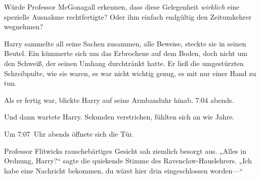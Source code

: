 Würde Professor McGonagall erkennen, dass diese Gelegenheit \emph{wirklich} eine spezielle Ausnahme rechtfertigte? Oder ihm einfach endgültig den Zeitumkehrer wegnehmen?

Harry sammelte all seine Sachen zusammen, alle Beweise, steckte sie in seinen Beutel. Ein  kümmerte sich um das Erbrochene auf dem Boden, doch nicht um den Schweiß, der seinen Umhang durchtränkt hatte. Er ließ die umgestürzten Schreibpulte, wie sie waren, es war nicht wichtig genug, es mit nur einer Hand zu tun.

Als er fertig war, blickte Harry auf seine Armbanduhr hinab. 7:04 abends.

Und dann wartete Harry. Sekunden verstrichen, fühlten sich an wie Jahre.

Um 7:07~Uhr abends öffnete sich die Tür.

Professor Flitwicks rauschebärtiges Gesicht sah ziemlich besorgt aus. „Alles in Ordnung, Harry?“ sagte die quiekende Stimme des Ravenclaw-Hauslehrers. „Ich habe eine Nachricht bekommen, du wärst hier drin eingeschlossen worden—“

